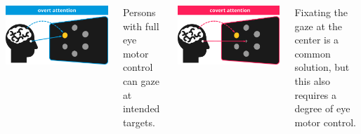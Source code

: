 \documentclass[25pt, a0paper, landscape]{tikzposter}
\begin{document}
\begin{columns}
{		\begin{minipage}{.48\linewidth}
			\includegraphics[width=\linewidth]{figures/attention_overt.pdf}
		\end{minipage}%
		\hfill%
		\begin{minipage}{.48\linewidth}
			Persons with full eye motor control can gaze at intended targets.
		\end{minipage}%
		\bigskip
		\bigskip

		\begin{minipage}{.48\linewidth}
			\includegraphics[width=\linewidth]{figures/attention_covert.pdf}
		\end{minipage}%
		\hfill%
		\begin{minipage}{.48\linewidth}
			Fixating the gaze at the center is a common solution, but this also requires a degree of eye motor control.
		\end{minipage}%
		\bigskip
		\bigskip

}
\end{columns}
\end{document}

